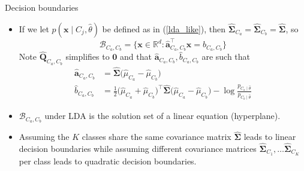 \documentclass{beamer}
\numberwithin{equation}{section}
\newcommand{\aref}[1]{\alert{\ref{#1}}}
\begin{document}
\begin{frame}{Decision boundaries}
    \begin{itemize}
        \item
        If we let $ p(\mathbf{x} \mid C_j, \hat{\theta}) $ be defined as in
        (\aref{lda_like}), then $ \hat{\mathbf{\Sigma}}_{C_a} =
        \hat{\mathbf{\Sigma}}_{C_b} = \hat{\mathbf{\Sigma}} $, so
        \begin{equation} \label{lda_decision_boundary}
            \mathcal{B}_{C_a, C_b} = \big\{
                \mathbf{x} \in \mathbb{R}^d :
                    \hat{\mathbf{a}}_{C_a, C_b}^\top\mathbf{x} =
                    \hat{b}_{C_a, C_b}
            \big\}
        \end{equation}
        Note $ \hat{\mathbf{Q}}_{C_a, C_b} $ simplifies to $ \mathbf{0} $ and
        that $ \hat{\mathbf{a}}_{C_a, C_b}, \hat{b}_{C_a, C_b} $ are such that
        \begin{equation*}
            \begin{split}
            \hat{\mathbf{a}}_{C_a, C_b} & = \hat{\mathbf{\Sigma}}
                \big(\hat{\mu}_{C_a} - \hat{\mu}_{C_b}\big) \\
            \hat{b}_{C_a, C_b} & = \frac{1}{2}
                \big(\hat{\mu}_{C_a} + \hat{\mu}_{C_b}\big)^\top
                \hat{\mathbf{\Sigma}}
                \big(\hat{\mu}_{C_a} - \hat{\mu}_{C_b}\big)
            - \log\frac{
                p_{C_a \mid \hat{\theta}}
            }{p_{C_b \mid \hat{\theta}}}
            \end{split}
        \end{equation*}

        \item
        $ \mathcal{B}_{C_a, C_b} $ under LDA is the solution set of a linear
        equation (hyperplane).

        \item
        Assuming the $ K $ classes share the same covariance matrix
        $ \hat{\mathbf{\Sigma}} $ leads to \alert{linear} decision boundaries
        while assuming different covariance matrices
        $ \hat{\mathbf{\Sigma}}_{C_1}, \ldots \hat{\mathbf{\Sigma}}_{C_K} $
        per class leads to \alert{quadratic} decision boundaries.
    \end{itemize}
\end{frame}
\end{document}
